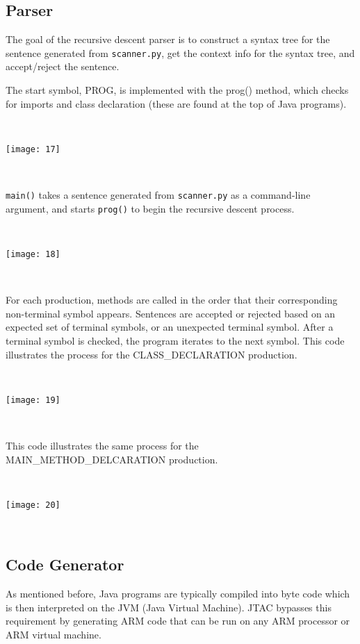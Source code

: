 \documentclass[11pt]{article}
\begin{document}
\subsection{Parser}

The goal of the recursive descent parser is to construct a syntax tree for the sentence generated from {\tt scanner.py}, get the context info for the syntax tree, and accept/reject the sentence. 

The start symbol, PROG, is implemented with the prog() method, which checks for imports and class declaration (these are found at the top of Java programs). 

~
\begin{center}
\texttt{[image: 17]}
\end{center}
~

{\tt main()} takes a sentence generated from {\tt scanner.py} as a command-line argument, and starts {\tt prog()} to begin the recursive descent process.

~
\begin{center}
\texttt{[image: 18]}
\end{center}
~

For each production, methods are called in the order that their corresponding non-terminal symbol appears. Sentences are accepted or rejected based on an expected set of terminal symbols, or an unexpected terminal symbol. After a terminal symbol is checked, the program iterates to the next symbol. This code illustrates the process for the CLASS\_DECLARATION production. 

~
\begin{center}
\texttt{[image: 19]}
\end{center}
~

This code illustrates the same process for the MAIN\_METHOD\_DELCARATION production.

~
\begin{center}
\texttt{[image: 20]}
\end{center}
~

\subsection{Code Generator}

\justifying
As mentioned before, Java programs are typically compiled into byte code which is then interpreted on the JVM (Java Virtual Machine). JTAC bypasses this requirement by generating ARM code that can be run on any ARM processor or ARM virtual machine. 
\end{document}
